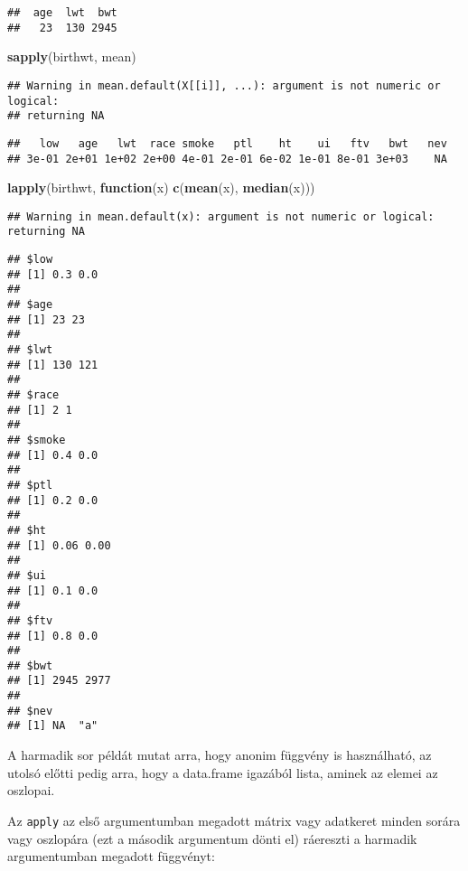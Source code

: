 \documentclass[]{book}
\newenvironment{Shaded}{\begin{snugshade}}{\end{snugshade}}
\newcommand{\ControlFlowTok}[1]{\textcolor[rgb]{0.13,0.29,0.53}{\textbf{#1}}}
\newcommand{\KeywordTok}[1]{\textcolor[rgb]{0.13,0.29,0.53}{\textbf{#1}}}
\newcommand{\NormalTok}[1]{#1}
\begin{document}
\begin{verbatim}
##  age  lwt  bwt 
##   23  130 2945
\end{verbatim}

\begin{Shaded}
\begin{Highlighting}[]
\KeywordTok{sapply}\NormalTok{(birthwt, mean)}
\end{Highlighting}
\end{Shaded}

\begin{verbatim}
## Warning in mean.default(X[[i]], ...): argument is not numeric or logical:
## returning NA
\end{verbatim}

\begin{verbatim}
##   low   age   lwt  race smoke   ptl    ht    ui   ftv   bwt   nev 
## 3e-01 2e+01 1e+02 2e+00 4e-01 2e-01 6e-02 1e-01 8e-01 3e+03    NA
\end{verbatim}

\begin{Shaded}
\begin{Highlighting}[]
\KeywordTok{lapply}\NormalTok{(birthwt, }\ControlFlowTok{function}\NormalTok{(x) }\KeywordTok{c}\NormalTok{(}\KeywordTok{mean}\NormalTok{(x), }\KeywordTok{median}\NormalTok{(x)))}
\end{Highlighting}
\end{Shaded}

\begin{verbatim}
## Warning in mean.default(x): argument is not numeric or logical: returning NA
\end{verbatim}

\begin{verbatim}
## $low
## [1] 0.3 0.0
## 
## $age
## [1] 23 23
## 
## $lwt
## [1] 130 121
## 
## $race
## [1] 2 1
## 
## $smoke
## [1] 0.4 0.0
## 
## $ptl
## [1] 0.2 0.0
## 
## $ht
## [1] 0.06 0.00
## 
## $ui
## [1] 0.1 0.0
## 
## $ftv
## [1] 0.8 0.0
## 
## $bwt
## [1] 2945 2977
## 
## $nev
## [1] NA  "a"
\end{verbatim}

A harmadik sor példát mutat arra, hogy anonim függvény is használható, az utolsó előtti pedig arra, hogy a data.frame igazából lista, aminek az elemei az oszlopai.

Az \texttt{apply} az első argumentumban megadott mátrix vagy adatkeret minden sorára vagy oszlopára (ezt a második argumentum dönti el) ráereszti a harmadik argumentumban megadott függvényt:
\end{document}
